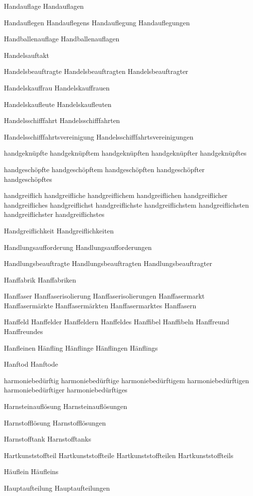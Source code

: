 Handauflage
Handauflagen

Handauflegen
Handauflegens
Handauflegung
Handauflegungen

Handballenauflage
Handballenauflagen

Handelsauftakt

Handelsbeauftragte
Handelsbeauftragten
Handelsbeauftragter

Handelskauffrau
Handelskauffrauen

Handelskaufleute
Handelskaufleuten

Handelsschifffahrt
Handelsschifffahrten

Handelsschifffahrtsvereinigung
Handelsschifffahrtsvereinigungen

handgeknüpfte
handgeknüpftem
handgeknüpften
handgeknüpfter
handgeknüpftes

handgeschöpfte
handgeschöpftem
handgeschöpften
handgeschöpfter
handgeschöpftes

handgreiflich
handgreifliche
handgreiflichem
handgreiflichen
handgreiflicher
handgreifliches
handgreiflichst
handgreiflichste
handgreiflichstem
handgreiflichsten
handgreiflichster
handgreiflichstes

Handgreiflichkeit
Handgreiflichkeiten

Handlungsaufforderung
Handlungsaufforderungen

Handlungsbeauftragte
Handlungsbeauftragten
Handlungsbeauftragter

Hanffabrik
Hanffabriken

Hanffaser
Hanffaserisolierung
Hanffaserisolierungen
Hanffasermarkt
Hanffasermärkte
Hanffasermärkten
Hanffasermarktes
Hanffasern

Hanffeld
Hanffelder
Hanffeldern
Hanffeldes
Hanffibel
Hanffibeln
Hanffreund
Hanffreundes

Hanfleinen
Hänfling
Hänflinge
Hänflingen
Hänflings

Hanftod
Hanftode

harmoniebedürftig
harmoniebedürftige
harmoniebedürftigem
harmoniebedürftigen
harmoniebedürftiger
harmoniebedürftiges

Harnsteinauflösung
Harnsteinauflösungen

Harnstofflösung
Harnstofflösungen

Harnstofftank
Harnstofftanks

Hartkunststoffteil
Hartkunststoffteile
Hartkunststoffteilen
Hartkunststoffteils

Häuflein
Häufleins

Hauptaufteilung
Hauptaufteilungen

